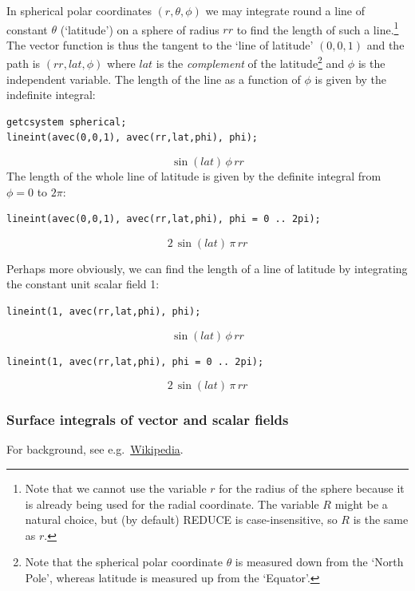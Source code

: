 \example{}

In spherical polar coordinates $(r,\theta,\phi)$ we may integrate
round a line of constant $\theta$ (`latitude') on a sphere of radius
$\mathit{rr}$ to find the length of such a line.\footnote{Note that we
cannot use the variable $r$ for the radius of the sphere because it is
already being used for the radial coordinate.  The variable $R$ might
be a natural choice, but (by default) REDUCE is case-insensitive, so
$R$ is the same as $r$.}  The vector function is thus the tangent to
the `line of latitude' $(0,0,1)$ and the path is
$(\mathit{rr},\mathit{lat},\phi)$ where $\mathit{lat}$ is
the \emph{complement} of the latitude\footnote{Note that the spherical
polar coordinate $\theta$ is measured down from the `North Pole',
whereas latitude is measured up from the `Equator'.} and $\phi$ is the
independent variable.  The length of the line as a function of $\phi$
is given by the indefinite integral:
\begin{verbatim}
getcsystem spherical;
lineint(avec(0,0,1), avec(rr,lat,phi), phi);
\end{verbatim}
\[ \sin(lat)\,\phi\,rr \]
The length of the whole line of latitude is given by the definite
integral from $\phi=0$ to $2\pi$:
\begin{verbatim}
lineint(avec(0,0,1), avec(rr,lat,phi), phi = 0 .. 2pi);
\end{verbatim}
\[ 2\,\sin(lat)\,\pi\,rr \]

Perhaps more obviously, we can find the length of a line of latitude
by integrating the constant unit scalar field 1:
\begin{verbatim}
lineint(1, avec(rr,lat,phi), phi);
\end{verbatim}
\[ \sin(lat)\,\phi\,rr \]
\begin{verbatim}
lineint(1, avec(rr,lat,phi), phi = 0 .. 2pi);
\end{verbatim}
\[ 2\,\sin(lat)\,\pi\,rr \]

\subsubsection{Surface integrals of vector and scalar fields}

For background, see e.g.\
\href{https://en.wikipedia.org/wiki/Surface_integral}{Wikipedia}.

